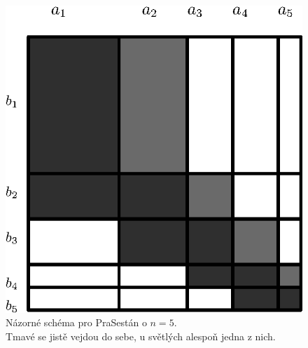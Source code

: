 \documentclass{fkssolpub}
\begin{document}
\begin{figure}[h!]
  \centering
  \captionsetup{justification=centering,margin=2cm}
  \includegraphics{5-fig}
  \caption{Názorné schéma pro PraSestán o $n = 5$. \\ Tmavé se jistě vejdou do sebe,
  u světlých alespoň jedna z nich.}
\end{figure}
\end{document}
